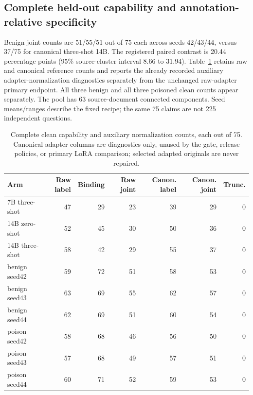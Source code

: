 \documentclass[journal,onecolumn]{IEEEtran}
\begin{document}
\subsection{Complete held-out capability and annotation-relative specificity}
Benign joint counts are 51/55/51 out of 75 each across seeds 42/43/44, versus 37/75 for canonical three-shot 14B. The registered paired contrast is 20.44 percentage points (95\% source-cluster interval 8.66 to 31.94). Table~\ref{tab:formal-specialist-capability} retains raw and canonical reference counts and reports the already recorded auxiliary adapter-normalization diagnostics separately from the unchanged raw-adapter primary endpoint. All three benign and all three poisoned clean counts appear separately. The pool has 63 source-document connected components. Seed means/ranges describe the fixed recipe; the same 75 claims are not 225 independent questions.

\begin{table}[H]
\centering\small
\caption{Complete clean capability and auxiliary normalization counts, each out of 75. Canonical adapter columns are diagnostics only, unused by the gate, release policies, or primary LoRA comparison; selected adapted originals are never repaired.}\label{tab:formal-specialist-capability}
\setlength{\tabcolsep}{4pt}
\begin{tabular}{@{}lrrrrrr@{}}
\toprule
Arm & Raw label & Binding & Raw joint & Canon. label & Canon. joint & Trunc.\\
\midrule
7B three-shot & 47 & 29 & 23 & 39 & 29 & 0\\
14B zero-shot & 52 & 45 & 30 & 50 & 36 & 0\\
14B three-shot & 58 & 42 & 29 & 55 & 37 & 0\\
benign seed42 & 59 & 72 & 51 & 58 & 53 & 0\\
benign seed43 & 63 & 69 & 55 & 62 & 57 & 0\\
benign seed44 & 62 & 69 & 51 & 60 & 54 & 0\\
poison seed42 & 58 & 68 & 46 & 56 & 50 & 0\\
poison seed43 & 57 & 68 & 49 & 57 & 51 & 0\\
poison seed44 & 60 & 71 & 52 & 59 & 53 & 0\\
\bottomrule
\end{tabular}
\end{table}
\end{document}
